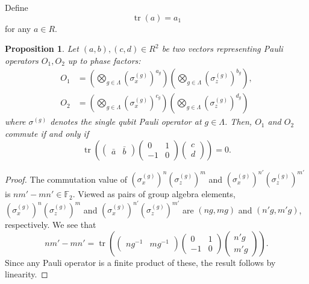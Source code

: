 \documentclass[letterpaper,12pt]{amsart}
\newtheorem{prop}[lem]{Proposition}
\theoremstyle{definition} \newtheorem{defn}{Definition}
\theoremstyle{definition} \newtheorem{rem}{Remark}
\theoremstyle{definition} \newtheorem{example}{Example}
\newcommand{\tr}{\mathop{\mathrm{tr}}}
\newcommand{\FF}{\mathbb{F}}
\begin{document}
Define
\[
 \tr(a) = a_1
\]
for any $a \in R$.
\begin{prop}
\cite{CalderbankRainsShorEtAl1997Quantum}
Let $(a,b), (c,d) \in R^2$ be two vectors representing Pauli operators $O_1, O_2$ up to phase factors:
\begin{align*}
 O_1 &= \left( \bigotimes_{g \in \Lambda} (\sigma_x^{(g)})^{a_g} \right) 
       \left( \bigotimes_{g \in \Lambda} (\sigma_z^{(g)})^{b_g} \right) ,
\\
 O_2 &= \left( \bigotimes_{g \in \Lambda} (\sigma_x^{(g)})^{c_g} \right) 
       \left( \bigotimes_{g \in \Lambda} (\sigma_z^{(g)})^{d_g} \right) 
\end{align*}
where $\sigma^{(g)}$ denotes the single qubit Pauli operator at $g \in \Lambda$.
Then, $O_1$ and $O_2$ commute if and only if  
\[
 \tr \left(
\begin{pmatrix} \bar a & \bar b \end{pmatrix}
\begin{pmatrix} 0 & 1 \\ -1 & 0 \end{pmatrix}
\begin{pmatrix} c \\ d \end{pmatrix}
\right) = 0 .
\]
\label{prop:trace-formula-commutation-value}
\end{prop}
\begin{proof}
The commutation value of $(\sigma_x^{(g)})^{n} (\sigma_z^{(g)})^{m}$
and $(\sigma_x^{(g)})^{n'} (\sigma_z^{(g)})^{m'}$
is $nm' - mn' \in \FF_2$.
Viewed as pairs of group algebra elements,
$(\sigma_x^{(g)})^{n} (\sigma_z^{(g)})^{m}$
and $(\sigma_x^{(g)})^{n'} (\sigma_z^{(g)})^{m'}$
are $(n g, m g)$ and $(n' g, m' g)$, respectively.
We see that
\[
 nm' - mn' =  \tr \left(
\begin{pmatrix} n g^{-1} &  m g^{-1} \end{pmatrix}
\begin{pmatrix} 0 & 1 \\ -1 & 0 \end{pmatrix}
\begin{pmatrix} n' g \\ m' g \end{pmatrix}
\right) .
\]
Since any Pauli operator is a finite product of these,
the result follows by linearity.
\end{proof}
\end{document}
